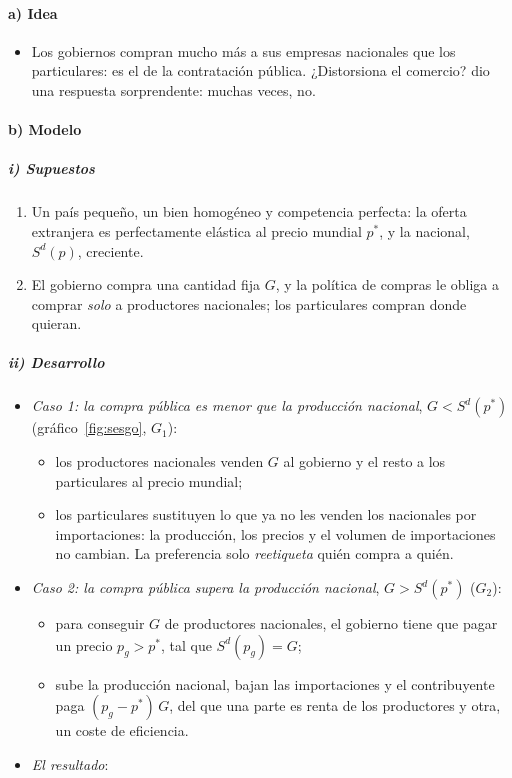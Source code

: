 \documentclass[11pt]{article}
\begin{document}
\paragraph{a) Idea}

\begin{itemize}
\item Los gobiernos compran mucho más a sus empresas nacionales que los particulares: es el  de la contratación pública. ¿Distorsiona el comercio? \textcite{Baldwin1970Nontariff} dio una respuesta sorprendente: muchas veces, no.
\end{itemize}

\paragraph{b) Modelo}

\subparagraph{i) Supuestos}

\begin{enumerate}
\item Un país pequeño, un bien homogéneo y competencia perfecta: la oferta extranjera es perfectamente elástica al precio mundial $p^*$, y la nacional, $S^d(p)$, creciente.
\item El gobierno compra una cantidad fija $G$, y la política de compras le obliga a comprar \emph{solo} a productores nacionales; los particulares compran donde quieran.
\end{enumerate}

\subparagraph{ii) Desarrollo}

\begin{itemize}
\item \emph{Caso 1: la compra pública es menor que la producción nacional}, $G<S^d(p^*)$ (gráfico~\ref{fig:sesgo}, $G_1$):
  \begin{itemize}
  \item los productores nacionales venden $G$ al gobierno y el resto a los particulares al precio mundial;
  \item los particulares sustituyen lo que ya no les venden los nacionales por importaciones: la producción, los precios y el volumen de importaciones no cambian. La preferencia solo \emph{reetiqueta} quién compra a quién.
  \end{itemize}
\item \emph{Caso 2: la compra pública supera la producción nacional}, $G>S^d(p^*)$ ($G_2$):
  \begin{itemize}
  \item para conseguir $G$ de productores nacionales, el gobierno tiene que pagar un precio $p_g>p^*$, tal que $S^d(p_g)=G$;
  \item sube la producción nacional, bajan las importaciones y el contribuyente paga $(p_g-p^*)\,G$, del que una parte es renta de los productores y otra, un coste de eficiencia.
  \end{itemize}
\item \emph{El resultado}:
\end{itemize}
\end{document}

